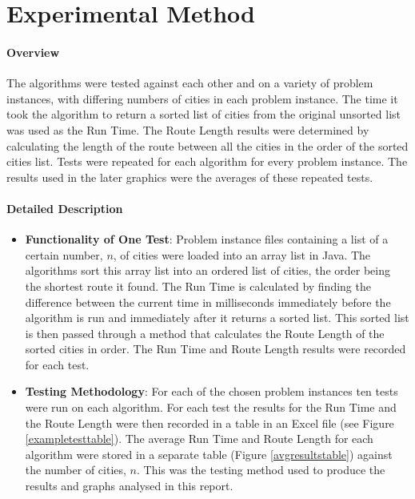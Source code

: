 \documentclass[conference,backref=page]{acmsiggraph}
\begin{document}
\section{Experimental Method}

\paragraph{Overview}
The algorithms were tested against each other and on a variety of problem instances, with differing numbers of cities in each problem instance. The time it took the algorithm to return a sorted list of cities from the original unsorted list was used as the Run Time. The Route Length results were determined by calculating the length of the route between all the cities in the order of the sorted cities list. Tests were repeated for each algorithm for every problem instance. The results used in the later graphics were the averages of these repeated tests.

\paragraph{Detailed Description}
\begin{itemize}
\item {\bf Functionality of One Test}: Problem instance files containing a list of a certain number, $n$, of cities were loaded into an array list in Java. The algorithms sort this array list into an ordered list of cities, the order being the shortest route it found. The Run Time is calculated by finding the difference between the current time in milliseconds immediately before the algorithm is run and immediately after it returns a sorted list. This sorted list is then passed through a method that calculates the Route Length of the sorted cities in order. The Run Time and Route Length results were recorded for each test.
\item {\bf Testing Methodology}: For each of the chosen problem instances ten tests were run on each algorithm. For each test the results for the Run Time and the Route Length were then recorded in a table in an Excel file (see Figure \ref{exampletesttable}). The average Run Time and Route Length for each algorithm were stored in a separate table (Figure \ref{avgresultstable}) against the number of cities, $n$. This was the testing method used to produce the results and graphs analysed in this report.
\end{itemize}
\end{document}
